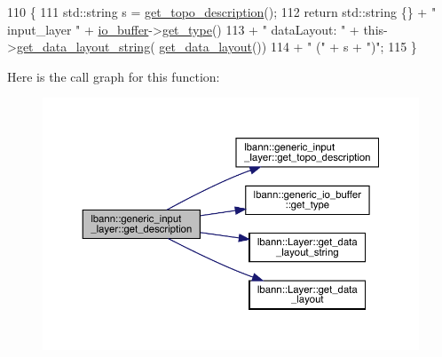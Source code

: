 \begin{DoxyCode}
110                                              \{
111     std::string s = \hyperlink{classlbann_1_1generic__input__layer_a36d9962105ca89889e3f38f1c1801560}{get\_topo\_description}();
112     \textcolor{keywordflow}{return} std::string \{\} + \textcolor{stringliteral}{" input\_layer "} + \hyperlink{classlbann_1_1generic__input__layer_a9dfe8b9afaebc7a5bcb0177ee2ab428f}{io\_buffer}->\hyperlink{classlbann_1_1generic__io__buffer_adc77c0a280f8a200a8d8495c3a371ebb}{get\_type}()
113            + \textcolor{stringliteral}{" dataLayout: "} + this->\hyperlink{classlbann_1_1Layer_ae3f4a5602df821f4221614b1e3782dc1}{get\_data\_layout\_string}(
      \hyperlink{classlbann_1_1Layer_a5dfb66e81fc085997402a5e2241316bd}{get\_data\_layout}())
114            + \textcolor{stringliteral}{" ("} + s + \textcolor{stringliteral}{")"};
115   \}
\end{DoxyCode}
Here is the call graph for this function\+:\nopagebreak
\begin{figure}[H]
\begin{center}
\leavevmode
\includegraphics[width=350pt]{classlbann_1_1generic__input__layer_a8ffe91a3d5b6f37d2dc17e657898dcc8_cgraph}
\end{center}
\end{figure}
\mbox{\label{classlbann_1_1generic__input__layer_a7ccb2e0dd8a9d9ab60e1e9d04bb80f2d}} 
